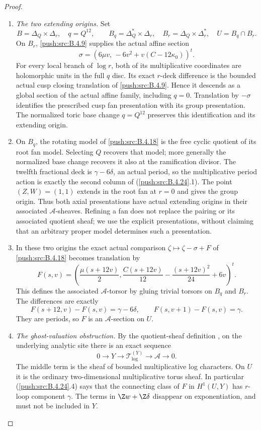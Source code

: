 \begin{proof}
\begin{enumerate}[label=\arabic*.,leftmargin=*]
\item \emph{The two extending origins.}
Set
\[
 B=\Delta_Q\times\Delta_r,\quad q=Q^{12},\qquad
 B_q=\Delta_Q^*\times\Delta_r,\quad
 B_r=\Delta_Q\times\Delta_r^*,\quad U=B_q\cap B_r.
\]
On $B_r$, \ref{push:src:B.4.9} supplies the actual affine section
\[
 \sigma=
 \left(6\mu v,\,-6v^2+v(C-12\kappa_0)\right)^t.
 \tag{B.4.24.2}
\]
For every local branch of $\log r$, both of its
multiplicative coordinates are holomorphic units
in the full $q$ disc. Its exact $r$-deck difference
is the bounded actual cusp closing translation
of \ref{push:src:B.4.9}. Hence it descends as a global section
of the actual affine family, including $q=0$.
Translation by $-\sigma$ identifies the prescribed
cusp fan presentation with its group presentation.
The normalized toric base change $q=Q^{12}$ preserves
this identification and its extending origin.

\item On $B_q$, the rotating model of \ref{push:src:B.4.18} is the
free cyclic quotient of its root fan model. Selecting
$Q$ recovers that model; more generally the normalized
base change recovers it also at the ramification
divisor. The twelfth fractional deck is
$\gamma-6\delta$, an actual period, so the
multiplicative period action is exactly the second
column of (\ref{push:src:B.4.24}.1). The point $(Z,W)=(1,1)$
extends in the root fan at $r=0$ and gives the
group origin. Thus both axial presentations have
actual extending origins in their associated
$\mathcal A$-sheaves. Refining a fan does not
replace the pairing or its associated quotient
sheaf; we use the explicit presentations, without
claiming that an arbitrary proper model determines
such a presentation.

\item In these two origins the exact actual comparison
$\zeta\mapsto\zeta-\sigma+F$ of \ref{push:src:B.4.18} becomes
translation by
\[
 F(s,v)=\left(
 \frac{\mu(s+12v)}2,
 \frac{C(s+12v)}{12}-\frac{(s+12v)^2}{24}+6v
 \right)^t.
 \tag{B.4.24.3}
\]
This defines the associated $\mathcal A$-torsor
by gluing trivial torsors on $B_q$ and $B_r$.
The differences are exactly
\[
 F(s+12,v)-F(s,v)=\gamma-6\delta,
 \qquad F(s,v+1)-F(s,v)=\gamma.
 \tag{B.4.24.4}
\]
They are periods, so $F$ is an $\mathcal A$-section
on $U$.

\item \emph{The ghost-valuation obstruction.}
By the quotient-sheaf definition
\citep[Sections 1.3.1--1.3.4, pp.~81--82]{KKN2008Root},
on the underlying analytic site there is an exact sequence
\[
 0\longrightarrow Y\longrightarrow
 \mathcal T_{\log}^{(Y)}\longrightarrow
 \mathcal A\longrightarrow0.
 \tag{B.4.24.5}
\]
The middle term is the sheaf of bounded multiplicative
log characters. On $U$ it is the ordinary
two-dimensional multiplicative torus sheaf.
In particular (\ref{push:src:B.4.24}.4) says that the connecting
class of $F$ in $H^1(U,Y)$ has $r$-loop component
$\gamma$. The terms in $\Z w+\Z\delta$ disappear
on exponentiation, and must not be included in $Y$.


\end{enumerate}
\end{proof}
